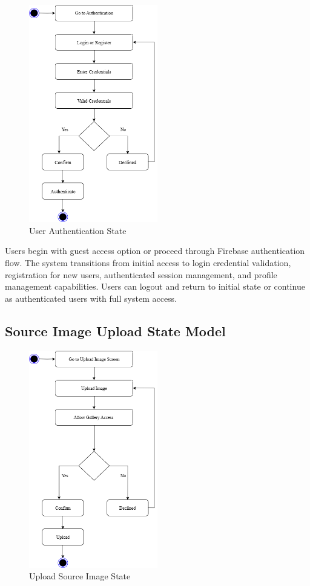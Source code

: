 \documentclass[12pt,a4paper]{report}
\begin{document}
\begin{figure}[H]
\centering
\includegraphics[width=0.5\textwidth]{figures/user_authentication_state.png}
\caption{User Authentication State}
\label{fig:authentication_state}
\end{figure}

Users begin with guest access option or proceed through Firebase authentication flow. The system transitions from initial access to login credential validation, registration for new users, authenticated session management, and profile management capabilities. Users can logout and return to initial state or continue as authenticated users with full system access.

\subsection{Source Image Upload State Model}

\begin{figure}[H]
\centering
\includegraphics[width=0.5\textwidth]{figures/upload_image_state.png}
\caption{Upload Source Image State}
\label{fig:upload_state}
\end{figure}
\end{document}
